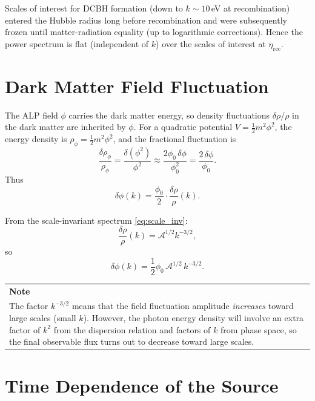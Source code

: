 \documentclass[12pt,a4paper]{report}
\newenvironment{notebox}[1][Note]{%
  \par\medskip\noindent
  \begin{tabular}{|p{\dimexpr\linewidth-2\tabcolsep-2\arrayrulewidth\relax}|}
  \hline
  \textbf{#1}\\[2pt]
}{%
  \\ \hline
  \end{tabular}
  \par\medskip
}
\newcommand{\phizero}{\phi_0}
\theoremstyle{definition}
\begin{document}
Scales of interest for DCBH formation (down to $k\sim 10$\,eV at recombination)
entered the Hubble radius long before recombination and were subsequently frozen
until matter-radiation equality (up to logarithmic corrections). Hence the
power spectrum is flat (independent of $k$) over the scales of interest at $\eta_{\mathrm{rec}}$.

\section{Dark Matter Field Fluctuation}

The ALP field $\phi$ carries the dark matter energy, so density fluctuations
$\delta\rho/\rho$ in the dark matter are inherited by $\phi$. For a quadratic
potential $V=\frac{1}{2}m^2\phi^2$, the energy density is $\rho_\phi=\frac{1}{2}m^2\phi^2$,
and the fractional fluctuation is
\begin{equation}
  \frac{\delta\rho_\phi}{\rho_\phi} = \frac{\delta(\phi^2)}{\phi^2}
  \approx \frac{2\phizero\,\delta\phi}{\phizero^2} = \frac{2\,\delta\phi}{\phizero}.
\end{equation}
Thus
\begin{equation}
  \delta\phi(k) = \frac{\phizero}{2}\cdot\frac{\delta\rho}{\rho}(k).
  \label{eq:delphi_drho}
\end{equation}

From the scale-invariant spectrum \eqref{eq:scale_inv}:
\begin{equation}
  \frac{\delta\rho}{\rho}(k) = \mathcal{A}^{1/2} k^{-3/2},
\end{equation}
so
\begin{equation}
  \delta\phi(k) = \frac{1}{2}\phizero\,\mathcal{A}^{1/2}\,k^{-3/2}.
  \label{eq:delphi}
\end{equation}

\begin{notebox}
The factor $k^{-3/2}$ means that the field fluctuation amplitude \emph{increases}
toward large scales (small $k$). However, the photon energy density will involve
an extra factor of $k^2$ from the dispersion relation and factors of $k$ from
phase space, so the final observable flux turns out to decrease toward large scales.
\end{notebox}

\section{Time Dependence of the Source}
\end{document}

